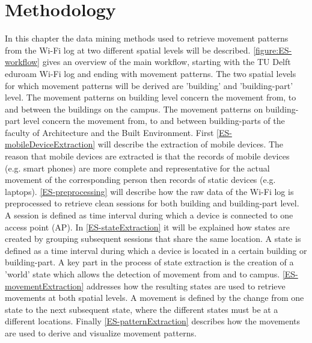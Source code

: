 \section{Methodology}\label{2-methodology}
In this chapter the data mining methods used to retrieve movement patterns from the Wi-Fi log at two different spatial levels will be described. \autoref{figure:ES-workflow} gives an overview of the main workflow, starting with the TU Delft eduroam Wi-Fi log and ending with movement patterns. The two spatial levels for which movement patterns will be derived are 'building' and 'building-part' level. The movement patterns on building level concern the movement from, to and between the buildings on the campus. The movement patterns on building-part level concern the movement from, to and between building-parts of the faculty of Architecture and the Built Environment. First \autoref{ES-mobileDeviceExtraction} will describe the extraction of mobile devices. The reason that mobile devices are extracted is that the records of mobile devices (e.g. smart phones) are more complete and representative for the actual movement of the corresponding person then records of static devices (e.g. laptops). \autoref{ES-preprocessing} will describe how the raw data of the Wi-Fi log is preprocessed to retrieve clean sessions for both building and building-part level. A session is defined as time interval during which a device is connected to one access point (AP). In \autoref{ES-stateExtraction} it will be explained how states are created by grouping subsequent sessions that share the same location. A state is defined as a time interval during which a device is located in a certain building or building-part. A key part in the process of state extraction is the creation of a 'world' state which allows the detection of movement from and to campus. \autoref{ES-movementExtraction} addresses how the resulting states are used to retrieve movements at both spatial levels. A movement is defined by the change from one state to the next subsequent state, where the different states must be at a different locations. Finally \autoref{ES-patternExtraction} describes how the movements are used to derive and visualize movement patterns.
